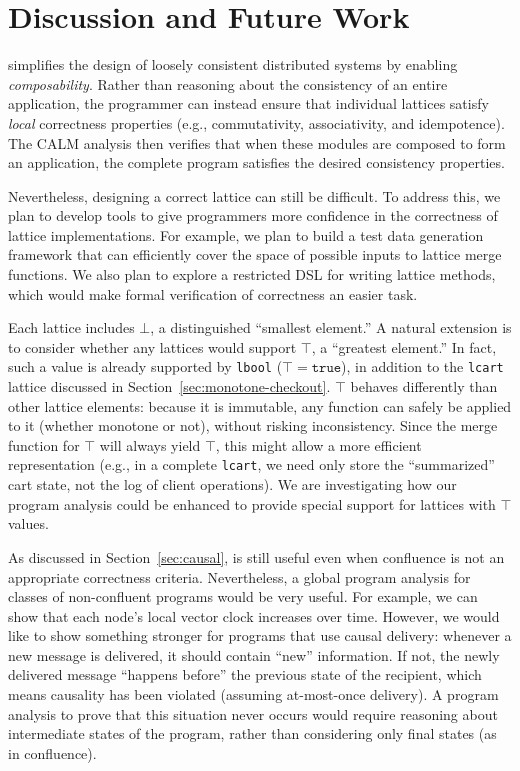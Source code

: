 \section{Discussion and Future Work}
\label{sec:discussion}

\lang simplifies the design of loosely consistent distributed systems by
enabling \emph{composability}. Rather than reasoning about the consistency of an
entire application, the programmer can instead ensure that individual lattices
satisfy \emph{local} correctness properties (e.g., commutativity, associativity,
and idempotence). The CALM analysis then verifies that when these modules are
composed to form an application, the complete program satisfies the desired
consistency properties.

Nevertheless, designing a correct lattice can still be difficult. To address
this, we plan to develop tools to give programmers more confidence in the
correctness of lattice implementations. For example, we plan to build a test
data generation framework that can efficiently cover the space of possible
inputs to lattice merge functions. We also plan to explore a restricted DSL for
writing lattice methods, which would make formal verification of correctness an
easier task.

Each lattice includes $\bot$, a distinguished ``smallest element.'' A natural
extension is to consider whether any lattices would support $\top$, a ``greatest
element.'' In fact, such a value is already supported by \texttt{lbool} ($\top =
\mathtt{true}$), in addition to the \texttt{lcart} lattice discussed in
Section~\ref{sec:monotone-checkout}. $\top$ behaves differently than other
lattice elements: because it is immutable, any function can safely be applied to
it (whether monotone or not), without risking inconsistency. Since the merge
function for $\top$ will always yield $\top$, this might allow a more efficient
representation (e.g., in a complete \texttt{lcart}, we need only store the
``summarized'' cart state, not the log of client operations). We are
investigating how our program analysis could be enhanced to provide special
support for lattices with $\top$ values.

As discussed in Section~\ref{sec:causal}, \lang is still useful even when
confluence is not an appropriate correctness criteria. Nevertheless, a global
program analysis for classes of non-confluent programs would be very useful. For
example, we can show that each node's local vector clock increases over
time. However, we would like to show something stronger for programs that use
causal delivery: whenever a new message is delivered, it should contain ``new''
information. If not, the newly delivered message ``happens before'' the previous
state of the recipient, which means causality has been violated (assuming
at-most-once delivery). A program analysis to prove that this situation never
occurs would require reasoning about intermediate states of the program, rather
than considering only final states (as in confluence).

